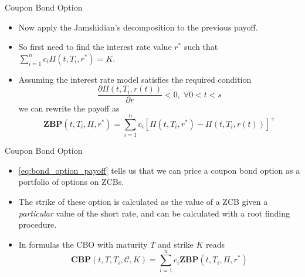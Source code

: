 \documentclass{beamer}
\begin{document}
\begin{frame}{Coupon Bond Option}
\begin{itemize}
	\item Now apply the Jamshidian's decomposition to the previous payoff.
	\item So first need to find the interest rate value $r^*$ such that $\sum_{i=1}^n c_i \Pi(t, T_i, r^*) = K$.
	\item Assuming the interest rate model satisfies the required condition
	\begin{equation*}
		\frac{\partial \Pi(t,T_i,r(t))}{\partial r}<0,\;\forall 0<t<s
	\end{equation*}
	we can rewrite the payoff as
	\begin{equation}
		\textbf{ZBP}(t,T_i,\Pi,r^*) = \sum_{i=1}^n c_i [\Pi(t, T_i, r^*)-\Pi(t, T_i, r(t))]^+
	\label{eq:bond_option_payoff}
	\end{equation}
\end{itemize}
\end{frame}

\begin{frame}{Coupon Bond Option}
\begin{itemize}
	\item \cref{eq:bond_option_payoff} tells us that we can price a coupon bond option as a portfolio of options on ZCBs.
	\item The strike of these option is calculated as the value of a ZCB given a \emph{particular} value of the short rate, and can be  calculated with a root finding procedure.
	\item In formulas the CBO with maturity $T$ and strike $K$ reads
	\begin{equation}
		\textbf{CBP}(t,T,T_i,\mathcal{C},K) = \sum_{i=1}^n c_i \textbf{ZBP}(t,T_i,\Pi,r^*)
	\end{equation}
\end{itemize}
\end{frame}
\end{document}
